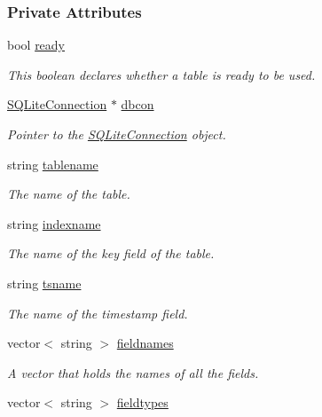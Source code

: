 \subsubsection*{Private Attributes}
\begin{CompactItemize}
\item 
bool \hyperlink{classSQLTable_SQLTableo0}{ready}
\begin{CompactList}\small\item\em This boolean declares whether a table is ready to be used.\item\end{CompactList}\item 
\hyperlink{classSQLiteConnection}{SQLite\-Connection} $\ast$ \hyperlink{classSQLTable_SQLTableo1}{dbcon}
\begin{CompactList}\small\item\em Pointer to the \hyperlink{classSQLiteConnection}{SQLite\-Connection} object.\item\end{CompactList}\item 
string \hyperlink{classSQLTable_SQLTableo2}{tablename}
\begin{CompactList}\small\item\em The name of the table.\item\end{CompactList}\item 
string \hyperlink{classSQLTable_SQLTableo3}{indexname}
\begin{CompactList}\small\item\em The name of the key field of the table.\item\end{CompactList}\item 
string \hyperlink{classSQLTable_SQLTableo4}{tsname}
\begin{CompactList}\small\item\em The name of the timestamp field.\item\end{CompactList}\item 
vector$<$ string $>$ \hyperlink{classSQLTable_SQLTableo5}{fieldnames}
\begin{CompactList}\small\item\em A vector that holds the names of all the fields.\item\end{CompactList}\item 
vector$<$ string $>$ \hyperlink{classSQLTable_SQLTableo6}{fieldtypes}

\end{CompactItemize}
